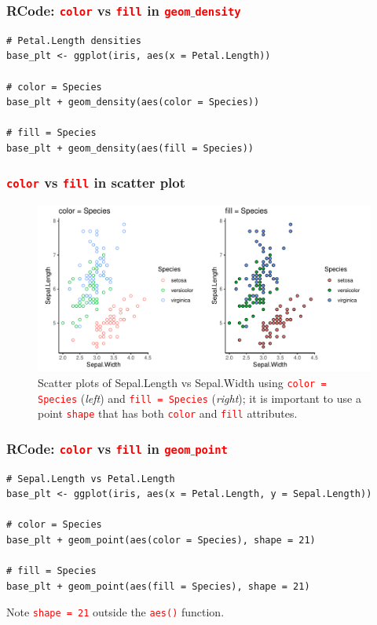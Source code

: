 \documentclass{beamer}
\begin{document}
\begin{frame}[fragile]\frametitle{RCode: \textcolor{red}{\texttt{color}} vs \textcolor{red}{\texttt{fill}} in \textcolor{red}{\texttt{geom}}$\_$\textcolor{red}{\texttt{density}}}
\lstset{basicstyle=\Large\ttfamily}
\begin{lstlisting}
# Petal.Length densities
base_plt <- ggplot(iris, aes(x = Petal.Length))

# color = Species
base_plt + geom_density(aes(color = Species))

# fill = Species
base_plt + geom_density(aes(fill = Species))
\end{lstlisting}
\end{frame}


\begin{frame}\frametitle{\textcolor{red}{\texttt{color}} vs \textcolor{red}{\texttt{fill}} in scatter plot}
\begin{figure}
\includegraphics[width=0.99\linewidth]{PlotsLec2/scatplt_ex1}
\caption{\small{Scatter plots of Sepal.Length vs Sepal.Width using \textcolor{red}{\texttt{color = Species}} (\textit{left}) and \textcolor{red}{\texttt{fill = Species}} (\textit{right}); it is important to use a point \textcolor{red}{\texttt{shape}} that has both \textcolor{red}{\texttt{color}} and \textcolor{red}{\texttt{fill}} attributes.}}
\end{figure}
\end{frame}


\begin{frame}[fragile]\frametitle{RCode: \textcolor{red}{\texttt{color}} vs \textcolor{red}{\texttt{fill}} in \textcolor{red}{\texttt{geom}}$\_$\textcolor{red}{\texttt{point}}}
\begin{lstlisting}
# Sepal.Length vs Petal.Length
base_plt <- ggplot(iris, aes(x = Petal.Length, y = Sepal.Length))

# color = Species
base_plt + geom_point(aes(color = Species), shape = 21)

# fill = Species
base_plt + geom_point(aes(fill = Species), shape = 21)
\end{lstlisting}
Note \textcolor{red}{\texttt{shape = 21}} outside the \textcolor{red}{\texttt{aes()}} function.
\end{frame}
\end{document}
